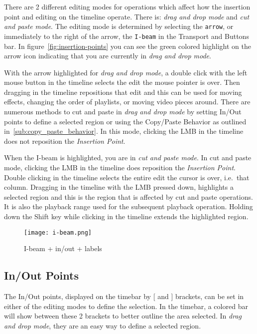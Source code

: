 There are 2 different editing modes for operations which affect how the insertion point and editing
on the timeline operate.  
There is:  \emph{drag and drop mode} and \emph{cut and paste mode}. 
The editing mode is determined by selecting the \texttt{arrow}, or immediately to the right of the arrow,
the \texttt{I-beam} in the Transport and Buttons bar. In figure~\ref{fig:insertion-points} you can see
the green colored highlight on the arrow icon indicating that you are currently in 
\emph{drag and drop mode}.

With the arrow highlighted for \emph{drag and drop mode}, a double click with the left mouse button in the timeline selects the edit the mouse pointer is over. 
Then dragging in the timeline repositions that edit and this can be used for moving effects,
changing the order of playlists, or moving video pieces around. 
There are numerous methods to cut and paste in \emph{drag and drop mode} by setting In/Out points to define
a selected region or using the Copy/Paste Behavior as outlined in~\ref{sub:copy_paste_behavior}. 
In this mode, clicking the LMB in the timeline does not reposition the \textit{Insertion Point}. 

When the I-beam is highlighted, you are in \emph{cut and paste mode}.
In cut and paste mode, clicking the LMB in the timeline does reposition the \textit{Insertion Point}. 
Double clicking in the timeline selects the entire edit the cursor is over, i.e.\ that column. 
Dragging in the timeline with the LMB pressed down, highlights a selected region and this is the region that is affected by cut
and paste operations.  It is also the playback range used for the subsequent playback operation. 
Holding down the Shift key while clicking in the timeline extends the highlighted region.

\begin{figure}[htpb]
    \centering
    \texttt{[image: i-beam.png]}
    \caption{I-beam + in/out  +  labels}
    \label{fig:i-beam}
\end{figure}

\subsection{In/Out Points}%
\label{sub:in_out_points}

The In/Out points, displayed on the timebar by [ and ] brackets,  can be set in either of the editing modes to define the selection.
In the timebar, a colored bar will show between these 2 brackets to better outline the area selected.
In \emph{drag and drop mode}, they are an easy way to define a selected region.


